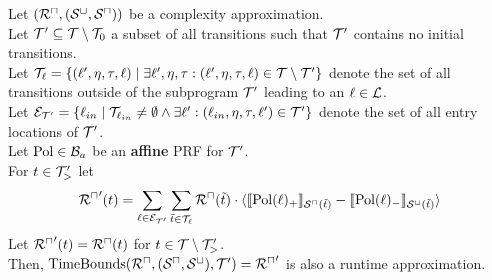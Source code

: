 \begin{theorem}[TimeBounds]
  Let $({\mathcal{R}^\sqcap}, {({\mathcal{S}^\sqcup}, {\mathcal{S}^\sqcap})})$ be a complexity approximation. \\
  Let $\mathcal{T}' \subseteq \mathcal{T} \setminus \mathcal{T}_0$ a subset of all transitions such that $\mathcal{T}'$ contains no initial transitions. \\
  Let $\mathcal{T}_{\ell} = \lbrace (\ell', \eta, \tau, \ell) \mid \exists \ell', \eta, \tau: (\ell', \eta, \tau, \ell) \in \mathcal{T} \setminus \mathcal{T}' \rbrace$ denote the set of all transitions outside of the subprogram $\mathcal{T}'$ leading to an $\ell \in \mathcal{L}$. \\
  Let $\mathcal{E}_{\mathcal{T}'} = \lbrace \ell_{in} \mid \mathcal{T}_{\ell_{in}} \neq \emptyset \wedge \exists \ell': (\ell_{in}, \eta, \tau, \ell') \in \mathcal{T}' \rbrace$ denote the set of all entry locations of $\mathcal{T}'$. \\
  Let $\text{Pol} \in \mathcal{B}_a$ be an \textbf{affine} PRF for $\mathcal{T}'$. \\
  For $t \in \mathcal{T}'_>$ let
  \[ {\mathcal{R}^\sqcap}'(t) = \sum_{\ell \in \mathcal{E}_{\mathcal{T}'}} \sum_{\tilde{t} \in \mathcal{T}_\ell} {\mathcal{R}^\sqcap}(\tilde{t}) \cdot \langle\llbracket \text{Pol}(\ell)_+ \rrbracket_{{\mathcal{S}^\sqcap}(\tilde{t})} - \llbracket \text{Pol}(\ell)_- \rrbracket_{{\mathcal{S}^\sqcup}(\tilde{t})}\rangle \]
  Let ${\mathcal{R}^\sqcap}'(t) = {\mathcal{R}^\sqcap}(t)$ for $t \in \mathcal{T} \setminus \mathcal{T}'_>$. \\
  Then, $\text{TimeBounds}({\mathcal{R}^\sqcap}, ({\mathcal{S}^\sqcap}, {\mathcal{S}^\sqcup}), \mathcal{T}') = {\mathcal{R}^\sqcap}'$ is also a runtime approximation.
\end{theorem}
